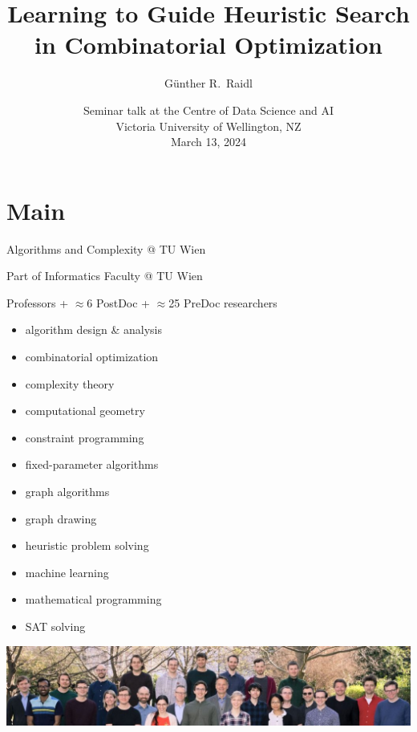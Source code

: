 \documentclass[aspectratio=1610]{beamer}
\title{Learning to Guide Heuristic Search in Combinatorial Optimization}
\author{Günther R.\ Raidl}
\date{Seminar talk at the Centre of Data Science and AI\\ Victoria University of Wellington, NZ\\March 13, 2024}
\institute[]{\normalsize Algorithms and Complexity , TU Wien, Austria,\\
    \texttt{raidl@ac.tuwien.ac.at}\\[1ex]
}
\begin{document}
{}


\part{Main}

\begin{frame}
  \titlepage
\end{frame} 


\begin{frame}{Algorithms and Complexity  @ TU Wien}

Part of Informatics Faculty @ TU Wien

 Professors + $\approx$6 PostDoc + $\approx$25 PreDoc researchers 

\medskip
{}

\medskip 
\begin{minipage}{0.4\textwidth}
  \begin{itemize}
      \item algorithm design \& analysis
      \item combinatorial optimization
      \item complexity theory
      \item computational geometry
      \item constraint programming
      \item fixed-parameter algorithms
  \end{itemize}
\end{minipage}\qquad
\begin{minipage}{0.4\textwidth}
  \begin{itemize}
      \item graph algorithms
      \item graph drawing
      \item heuristic problem solving
      \item machine learning
      \item mathematical programming
      \item SAT solving
    \end{itemize}
  \end{minipage}

  \bigskip
  \includegraphics[width=\textwidth]{figures/group.jpg}
\end{frame}
\end{document}
